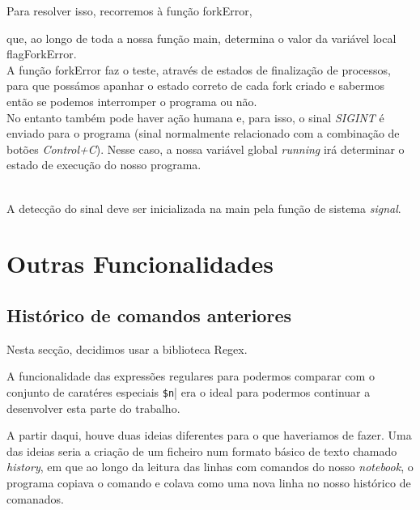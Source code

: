 \documentclass[11pt,a4paper]{report}
\begin{document}
Para resolver isso, recorremos à função forkError,



que, ao longo de toda a nossa função main, determina o valor da variável local flagForkError. 
~\\

A função forkError faz o teste, através de estados de finalização de processos, para que possámos apanhar o estado correto de cada fork criado e sabermos então se podemos interromper o programa ou não.
~\\

No entanto também pode haver ação humana e, para isso, o sinal \textit{SIGINT} é enviado para o programa (sinal normalmente relacionado com a combinação de botões \textit{Control+C}).
Nesse caso, a nossa variável global \textit{running} irá determinar o estado de execução do nosso programa.


~\\

A detecção do sinal deve ser inicializada na main pela função de sistema \textit{signal}.
\raggedbottom
\pagebreak

\chapter{Outras Funcionalidades}
\section{Histórico de comandos anteriores}

Nesta secção, decidimos usar a biblioteca Regex.


A funcionalidade das expressões regulares para podermos comparar com o conjunto de caratéres especiais \verb|$n|| era o ideal para podermos continuar a desenvolver esta parte do trabalho.

A partir daqui, houve duas ideias diferentes para o que haveriamos de fazer. Uma das ideias seria a criação de um ficheiro num formato básico de texto chamado \textit{history}, em que ao longo da leitura das linhas com comandos do nosso \textit{notebook}, o programa copiava o comando e colava como uma nova linha no nosso histórico de comanados. 
\end{document}
